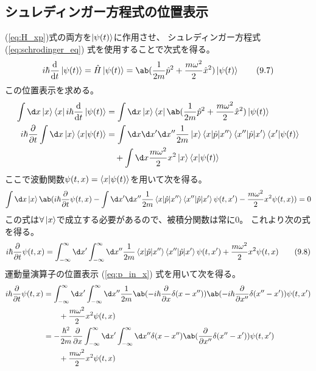
\subsection{シュレディンガー方程式の位置表示}

(\ref{eq:H_xp})式の両方を$\ket{\psi(t)}$に作用させ、
シュレディンガー方程式 (\ref{eq:schrodinger_eq}) 式を使用することで次式を得る。
\begin{equation}
  i\hbar\odv{}{t}\ket{\psi(t)}
  =\hat{H}\ket{\psi(t)}
  =\ab(\frac{1}{2m}\hat{p}^2+\frac{m\omega^2}{2}\hat{x}^2)\ket{\psi(t)}
  \tag{9.7}
\end{equation}
この位置表示を求める。
\begin{equation}
  \begin{split}
    \int\d x\ket{x}\bra{x}i\hbar\odv{}{t}\ket{\psi(t)}
    &=\int\d x\ket{x}\bra{x}
    \ab(\frac{1}{2m}\hat{p}^2+\frac{m\omega^2}{2}\hat{x}^2)\ket{\psi(t)} \\
    i\hbar\pdv{}{t}\int\d x\ket{x}\braket{x|\psi(t)}
    &=\int\d x\d x'\d x''
    \frac{1}{2m}
    \ket{x}\braket{x|\hat{p}|x''}\braket{x''|\hat{p}|x'}\braket{x'|\psi(t)} \\
    &\quad+\int\d x \frac{m\omega^2}{2}x^2\ket{x}\braket{x|\psi(t)}
  \end{split}
\end{equation}
ここで波動関数$\psi(t,x)=\braket{x|\psi(t)}$を用いて次を得る。
\begin{equation}
  \int\d x\ket{x}\ab(
  i\hbar\pdv{}{t}\psi(t,x)
  -\int\d x'\d x''
  \frac{1}{2m}\braket{x|\hat{p}|x''}\braket{x''|\hat{p}|x'}\psi(t,x')
  -\frac{m\omega^2}{2}x^2\psi(t,x))=0
\end{equation}
この式は$\forall\ket{x}$で成立する必要があるので、被積分関数は常に0。
これより次の式を得る。
\begin{equation}
  \label{eq:harmonic_oscillator_middle}
  i\hbar\pdv{}{t}\psi(t,x)
  =
  \int_{-\infty}^\infty\d x'\int_{-\infty}^\infty\d x''
  \frac{1}{2m}\braket{x|\hat{p}|x''}\braket{x''|\hat{p}|x'}\psi(t,x')
  +\frac{m\omega^2}{2}x^2\psi(t,x)
  \tag{9.8}
\end{equation}
運動量演算子の位置表示 (\ref{eq:p_in_x}) 式を用いて次を得る。
\begin{equation}
  \begin{split}
    i\hbar\pdv{}{t}\psi(t,x)
    &=
    \int_{-\infty}^\infty\d x'\int_{-\infty}^\infty\d x''
    \frac{1}{2m}
    \ab(-i\hbar\pdv{}{x}\delta(x-x''))\ab(-i\hbar\pdv{}{x''}\delta(x''-x'))
    \psi(t,x') \\
    &\qquad+\frac{m\omega^2}{2}x^2\psi(t,x) \\
    &=
    -\frac{\hbar^2}{2m}\pdv{}{x}
    \int_{-\infty}^\infty\d x'\int_{-\infty}^\infty\d x''
    \delta(x-x'')\ab(\pdv{}{x''}\delta(x''-x'))
    \psi(t,x') \\
    &\qquad+\frac{m\omega^2}{2}x^2\psi(t,x)
  \end{split}
\end{equation}
